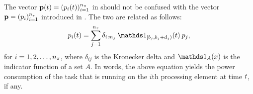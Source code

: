 The vector $\mathbf{p}(t) = (p_i(t))_{i = 1}^{{n_\pi}}$ in 
should not be confused with the vector $\mathbf{p} = (p_i)_{i = 1}^{{n_\tau}}$ introduced in
. The two are related as follows:
\[
  p_i(\t) = \sum_{j = 1}^{\nt} \delta_{i\,m_j} \: \one_{[\b_j, \b_j + \d_j)}(\t) \: p_j,
\]
for $i = 1, 2, \dots, {n_\pi}$, where $\delta_{ij}$ is the Kronecker delta and
$\one_A(x)$ is the indicator function of a set $A$. In words, the above equation
yields the power consumption of the task that is running on the $i$th processing
element at time $t$, if any.
